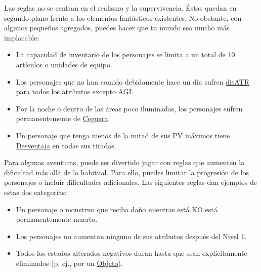 \begin{description}[leftmargin=*]

\item[\color{accent} Supervivencia:] Las reglas no se centran en el realismo y la supervivencia. Éstas quedan en segundo plano frente a los elementos fantásticos existentes. No obstante, con algunos pequeños agregados, puedes hacer que tu mundo sea mucho más implacable: 
\begin{itemize}[leftmargin=*]  
	\item La capacidad de inventario de los personajes se limita a un total de 10 artículos o unidades de equipo.
	\item Los personajes que no han comido debidamente hace un día sufren \hyperlink{status}{disATR} para todos los atributos excepto AGI.
	\item Por la noche o dentro de las áreas poco iluminadas, los personajes sufren permanentemente de \hyperlink{status}{Ceguera}. 
	\item Un personaje que tenga menos de la mitad de sus PV máximos tiene \hyperlink{check}{Desventaja} en todas sus tiradas.
\end{itemize}

\vfill

\item[\color{accent} Desafíos:] Para algunas aventuras, puede ser divertido jugar con reglas que aumenten la dificultad más allá de lo habitual. Para ello, puedes limitar la progresión de los personajes o incluir dificultades adicionales. Las siguientes reglas dan ejemplos de estas dos categorías:
\begin{itemize}[leftmargin=*]   
	\item Un personaje o monstruo que reciba daño mientras está \hyperlink{status}{KO} está permanentemente muerto.
	\item Los personajes no aumentan ninguno de sus atributos después del Nivel 1.
	\item Todos los estados alterados negativos duran hasta que sean explícitamente eliminados (p. ej., por un \hyperlink{item}{Objeto}).
\end{itemize}

\pagebreak


\end{description}

